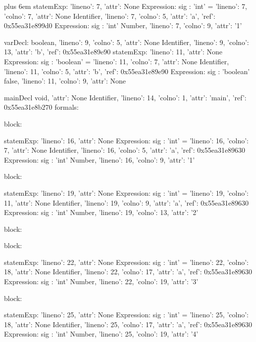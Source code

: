 \documentclass{article}
\makeatletter
\newenvironment{myverb}
 {\def\@xobeysp{\ }\verbatim\rightskip=0pt plus 6em\relax}
 {\endverbatim}
\makeatother
\begin{document}
\begin{itemize}
\begin{myverb}
      statemExp: {'lineno': 7, 'attr': None}
        Expression: {sig : 'int'}
          = {'lineno': 7, 'colno': 7, 'attr': None}
            Identifier, {'lineno': 7, 'colno': 5, 'attr': 'a', 'ref': 0x55ea31e899d0}
            Expression: {sig : 'int'}
              Number, {'lineno': 7, 'colno': 9, 'attr': '1'}


      varDecl:
        boolean, {'lineno': 9, 'colno': 5, 'attr': None}
        Identifier, {'lineno': 9, 'colno': 13, 'attr': 'b', 'ref': 0x55ea31e89e90}
      statemExp: {'lineno': 11, 'attr': None}
        Expression: {sig : 'boolean'}
          = {'lineno': 11, 'colno': 7, 'attr': None}
            Identifier, {'lineno': 11, 'colno': 5, 'attr': 'b', 'ref': 0x55ea31e89e90}
            Expression: {sig : 'boolean'}
              false, {'lineno': 11, 'colno': 9, 'attr': None}


mainDecl
    void, {'attr': None}
    Identifier, {'lineno': 14, 'colno': 1, 'attr': 'main', 'ref': 0x55ea31e8b270}
      formals:

    block:

      statemExp: {'lineno': 16, 'attr': None}
        Expression: {sig : 'int'}
          = {'lineno': 16, 'colno': 7, 'attr': None}
            Identifier, {'lineno': 16, 'colno': 5, 'attr': 'a', 'ref': 0x55ea31e89630}
            Expression: {sig : 'int'}
              Number, {'lineno': 16, 'colno': 9, 'attr': '1'}


      block:

        statemExp: {'lineno': 19, 'attr': None}
          Expression: {sig : 'int'}
            = {'lineno': 19, 'colno': 11, 'attr': None}
              Identifier, {'lineno': 19, 'colno': 9, 'attr': 'a', 'ref': 0x55ea31e89630}
              Expression: {sig : 'int'}
                Number, {'lineno': 19, 'colno': 13, 'attr': '2'}


        block:

          block:

            statemExp: {'lineno': 22, 'attr': None}
              Expression: {sig : 'int'}
                = {'lineno': 22, 'colno': 18, 'attr': None}
                  Identifier, {'lineno': 22, 'colno': 17, 'attr': 'a', 'ref': 0x55ea31e89630}
                  Expression: {sig : 'int'}
                    Number, {'lineno': 22, 'colno': 19, 'attr': '3'}


          block:

            statemExp: {'lineno': 25, 'attr': None}
              Expression: {sig : 'int'}
                = {'lineno': 25, 'colno': 18, 'attr': None}
                  Identifier, {'lineno': 25, 'colno': 17, 'attr': 'a', 'ref': 0x55ea31e89630}
                  Expression: {sig : 'int'}
                    Number, {'lineno': 25, 'colno': 19, 'attr': '4'}


\end{myverb}
\end{itemize}
\end{document}
